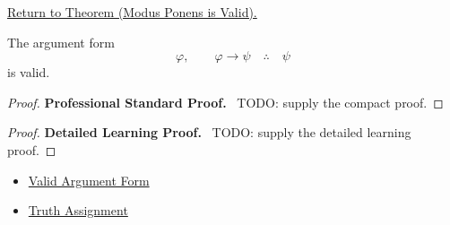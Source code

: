 \newpage
{}
\label{prf:modus-ponens-validity-propositional-logic}

\begin{remark*}[Return]
\hyperref[thm:modus-ponens-validity-propositional-logic]{Return to Theorem (Modus Ponens is Valid).}
\end{remark*}

\begin{theorem*}
The argument form
\[
\varphi,\qquad \varphi\to\psi \quad\therefore\quad \psi
\]
is valid.
\end{theorem*}

\begin{proof}
\textbf{Professional Standard Proof.}~
TODO: supply the compact proof.
\end{proof}

\begin{proof}
\textbf{Detailed Learning Proof.}~
TODO: supply the detailed learning proof.
\end{proof}

\begin{remark*}
\end{remark*}

\begin{dependencies}
\begin{itemize}
  \item \hyperref[def:valid-argument-form-propositional-logic]{Valid Argument Form}
  \item \hyperref[def:truth-assignment-propositional-logic]{Truth Assignment}
\end{itemize}
\end{dependencies}

\clearpage
